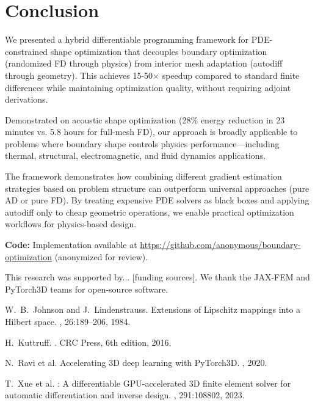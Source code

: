 \documentclass{article}
\begin{document}
\section{Conclusion}

We presented a hybrid differentiable programming framework for PDE-constrained shape optimization that decouples boundary optimization (randomized FD through physics) from interior mesh adaptation (autodiff through geometry). This achieves 15-50$\times$ speedup compared to standard finite differences while maintaining optimization quality, without requiring adjoint derivations.

Demonstrated on acoustic shape optimization (28\% energy reduction in 23 minutes vs. 5.8 hours for full-mesh FD), our approach is broadly applicable to problems where boundary shape controls physics performance—including thermal, structural, electromagnetic, and fluid dynamics applications.

The framework demonstrates how combining different gradient estimation strategies based on problem structure can outperform universal approaches (pure AD or pure FD). By treating expensive PDE solvers as black boxes and applying autodiff only to cheap geometric operations, we enable practical optimization workflows for physics-based design.

\textbf{Code:} Implementation available at \url{https://github.com/anonymous/boundary-optimization} (anonymized for review).

\begin{ack}
This research was supported by... [funding sources]. We thank the JAX-FEM and PyTorch3D teams for open-source software.
\end{ack}


\begin{thebibliography}{10}

W.~B.~Johnson and J.~Lindenstrauss.
\newblock Extensions of Lipschitz mappings into a Hilbert space.
, 26:189--206, 1984.

H.~Kuttruff.
.
\newblock CRC Press, 6th edition, 2016.

N.~Ravi et al.
\newblock Accelerating {3D} deep learning with {PyTorch3D}.
, 2020.

T.~Xue et al.
: A differentiable {GPU}-accelerated {3D} finite element solver for automatic differentiation and inverse design.
, 291:108802, 2023.

\end{thebibliography}
\end{document}
